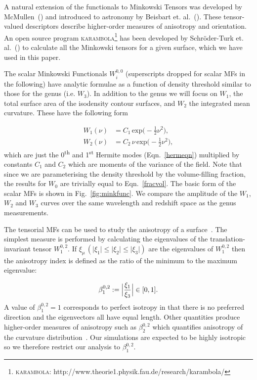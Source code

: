 \documentclass[a4paper,fleqn,usenatbib]{mnras}
\begin{document}
A natural extension of the functionals to Minkowski Tensors was developed by McMullen~(\citeyear{1997McMullen}) and introduced to astronomy by Beisbart et. al.~(\citeyear{2002LNP...600..238B}). These tensor-valued descriptors describe higher-order measures of anisotropy and orientation. An open source program \textsc{karambola}\footnote{\textsc{karambola}: http://www.theorie1.physik.fau.de/research/karambola/} has been developed by Schr\"oder-Turk et. al.~(\citeyear{2013NJPh...15h3028S}) to calculate all the Minkowski tensors for a given surface, which we have used in this paper.

The scalar Minkowski Functionals $W_i^{0,0}$ (superscripts dropped for scalar MFs in the following) have analytic formulae as a function of density threshold similar to those for the genus (i.e. $W_3$). In addition to the genus we will focus on $W_1$, the total surface area of the isodensity contour surfaces, and $W_2$ the integrated mean curvature. These have the following form

\begin{align}
W_1(\nu) &= C_1 \, \mathrm{exp} \Big( -\frac{1}{2} \nu^2 \Big), \\
W_2(\nu) &= C_2 \, \nu \, \mathrm{exp} \Big( -\frac{1}{2} \nu^2 \Big),
\end{align}
which are just the 0\textsuperscript{th} and 1\textsuperscript{st} Hermite modes (Eqn.~\ref{hermeqn}) multiplied by constants $C_1$ and $C_2$ which are moments of the variance of the field. Note that since we are parameterising the density threshold by the volume-filling fraction, the results for $W_0$ are trivially equal to Eqn.~\ref{fracvol}. The basic form of the scalar MFs is shown in Fig.~\ref{fig:minkfunc}. We compare the amplitude of the $W_1$, $W_2$ and $W_3$ curves over the same wavelength and redshift space as the genus measurements. 

The tensorial MFs can be used to study the anisotropy of a surface~\citep{2013NJPh...15h3028S}. The simplest measure is performed by calculating the eigenvalues of the translation-invariant %
tensor $W_1^{0,2}$. If $\xi_\mu \, (\lvert \xi_1 \rvert \leq \lvert \xi_2 \rvert \leq \lvert \xi_3 \rvert)$ are the eigenvalues of $W_1^{0,2}$ then the anisotropy index is defined as the ratio of the minimum to the maximum eigenvalue:

\begin{equation}
\beta_1^{0,2} := \Bigl\lvert \frac{\xi_1}{\xi_3} \Bigr\rvert \in [0,1].
\end{equation}
A value of $\beta_1^{0,2} = 1$ corresponds to perfect isotropy in that there is no preferred direction and the eigenvectors all have equal length. Other quantities produce higher-order measures of anisotropy such as $\beta_2^{0,2}$ which quantifies anisotropy of the curvature distribution~\citep{2013NJPh...15h3028S}. Our simulations are expected to be highly isotropic so we therefore restrict our analysis to $\beta_1^{0,2}$.
\end{document}
